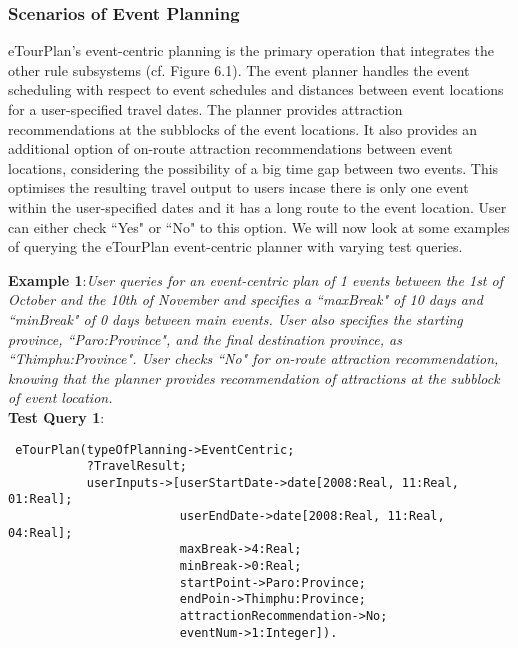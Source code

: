 \subsubsection{Scenarios of Event Planning}
\hspace{0.3in}eTourPlan's event-centric planning is the primary operation that integrates the other rule subsystems (cf. Figure 6.1). The event planner handles the event scheduling with respect to event schedules and distances between event locations for a user-specified travel dates. The planner provides attraction recommendations at the subblocks of the event locations. It also provides an additional option of on-route attraction recommendations between event locations, considering the possibility of a big time gap between two events. This optimises the resulting travel output to users incase there is only one event within the user-specified dates and it has a long route to the event location. User can either check ``Yes" or ``No" to this option. We will now look at some examples of querying the eTourPlan event-centric planner with varying test queries. 

\hspace{0.3in}\textbf{Example 1}:\emph{User queries for an event-centric plan of 1 events between the 1st of
October and the 10th of November and specifies a ``maxBreak" of 10
days and ``minBreak" of 0 days between main events. User also
specifies the starting province, ``Paro:Province", and the final
destination province, as ``Thimphu:Province". User checks ``No" for
on-route attraction recommendation, knowing that the planner
provides recommendation of attractions at the subblock of event
location.}\\

\hspace{0.3in}\textbf{Test Query 1}:

\begin{small}
\singlespacing
\begin{verbatim}
 eTourPlan(typeOfPlanning->EventCentric;  
           ?TravelResult;
           userInputs->[userStartDate->date[2008:Real, 11:Real, 01:Real];  
                        userEndDate->date[2008:Real, 11:Real, 04:Real]; 
                        maxBreak->4:Real;  
                        minBreak->0:Real; 
                        startPoint->Paro:Province;  
                        endPoin->Thimphu:Province;
                        attractionRecommendation->No; 
                        eventNum->1:Integer]).
\end{verbatim}
\end{small}

